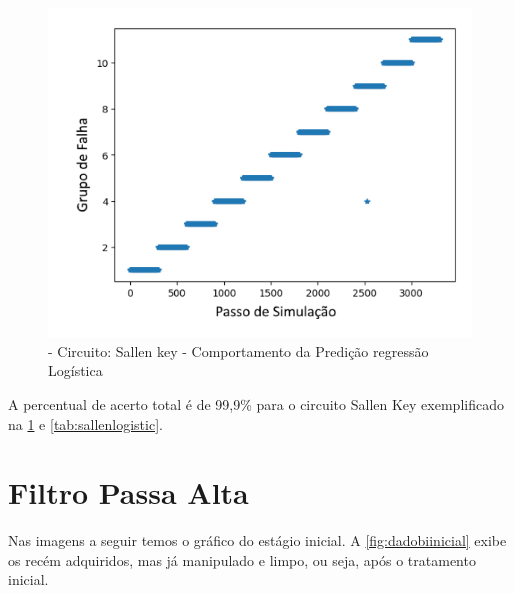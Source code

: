 \begin{itemize}
  \begin{figure}[H]
        \begin{center}
        \includegraphics[width=12.5cm]{./01_Pre_textuais/sallen_figs/LogisticRegression_Sallen_Key_mc_+_4bitPRBS_[FALHA]raw.png}
        \caption{\label{fig:LogisticRegressionClassifieSalenkey}- Circuito: Sallen key - Comportamento da Predição regressão Logística }
        \end{center}
        \end{figure}



A percentual de acerto total é de 99,9\% para o circuito Sallen Key exemplificado na \ref{fig:LogisticRegressionClassifieSalenkey} e \ref{tab:sallenlogistic}. 


\end{itemize} 







\section{\textbf{Filtro Passa Alta}}


 Nas imagens a seguir temos o gráfico do estágio inicial. A  \ref{fig:dadobiinicial} exibe os recém adquiridos, mas já manipulado e limpo, ou seja, após o tratamento inicial. 
        

